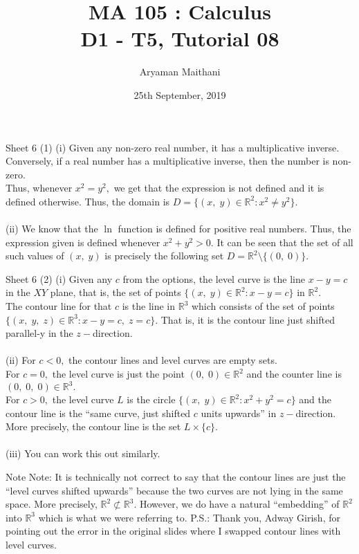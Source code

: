 \documentclass[handout, aspectratio=169]{beamer}
\title{MA 105 : Calculus\\ D1 - T5, Tutorial 08}  %
\author{Aryaman Maithani}
\date[25-09-2019]{25th September, 2019}               %
\institute[IITB]{IIT Bombay}
\begin{document}
\begin{frame}
	\titlepage
\end{frame}
\begin{frame}{Sheet 6}                            %
	(1) (i) Given any non-zero real number, it has a multiplicative inverse. Conversely, if a real number has a multiplicative inverse, then the number is non-zero.\\
	Thus, whenever $x^2 = y^2,$ we get that the expression is not defined and it is defined otherwise. Thus, the domain is $D = \{(x,\;y) \in \mathbb{R}^2 : x^2 \neq y^2\}.$\\~\\
	(ii) We know that the $\ln$ function is defined for positive real numbers. Thus, the expression given is defined whenever $x^2 + y^2 > 0.$ It can be seen that the set of all such values of $(x,\;y)$ is precisely the following set $D = \mathbb{R}^2\setminus\{(0,\;0)\}.$
\end{frame}
\begin{frame}{Sheet 6}
	(2) (i) Given any $c$ from the options, the level curve is the line $x - y = c$ in the $XY$ plane, that is, the set of points $\{(x,\;y) \in \mathbb{R}^2 : x - y = c\}$ in $\mathbb{R}^2.$\\
	The contour line for that $c$ is the line in $\mathbb{R}^3$ which consists of the set of points $\{(x,\;y,\;z)\in\mathbb{R}^3 : x - y = c,\;z = c\}.$ That is, it is the contour line just shifted parallel-y in the $z-$direction.\\~\\
	(ii) For $c < 0,$ the contour lines and level curves are empty sets.\\
	For $c = 0,$ the level curve is just the point $(0,\;0)\in \mathbb{R}^2$ and the counter line is $(0,\;0,\;0)\in \mathbb{R}^3.$\\
	For $c > 0,$ the level curve $L$ is the circle $\{(x,\;y)\in\mathbb{R}^2:x^2 + y^2 = c\}$ and the contour line is the ``same curve, just shifted $c$ units upwards'' in $z-$direction. More precisely, the contour line is the set $L \times \{c\}.$\\~\\
	(iii) You can work this out similarly.\\
\end{frame}
	
\begin{frame}{Note}
	Note: It is technically not correct to say that the contour lines are just the ``level curves shifted upwards'' because the two curves are not lying in the same space. More precisely, $\mathbb{R}^2 \not\subset \mathbb{R}^3.$ However, we do have a natural ``embedding'' of $\mathbb{R}^2$ into $\mathbb{R}^3$ which is what we were referring to.
	\vfill
	P.S.: Thank you, Adway Girish, for pointing out the error in the original slides where I swapped contour lines with level curves.
\end{frame}
\end{document}
